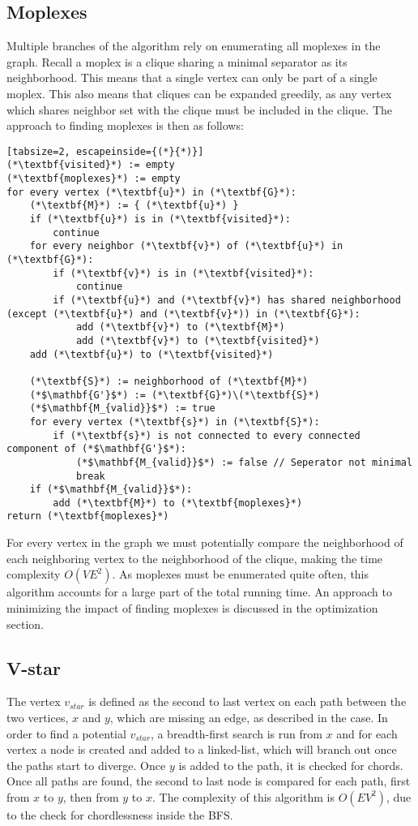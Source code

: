 \documentclass{article}
\begin{document}
		\subsection{Moplexes}
		Multiple branches of the algorithm rely on enumerating all moplexes in the graph.
		Recall a moplex is a clique sharing a minimal separator as its neighborhood.
		This means that a single vertex can only be part of a single moplex.
		This also means that cliques can be expanded greedily, as any vertex which shares neighbor set with the clique must be included in the clique.
		The approach to finding moplexes is then as follows:
		\begin{lstlisting}[tabsize=2, escapeinside={(*}{*)}]
(*\textbf{visited}*) := empty
(*\textbf{moplexes}*) := empty
for every vertex (*\textbf{u}*) in (*\textbf{G}*):
	(*\textbf{M}*) := { (*\textbf{u}*) }
	if (*\textbf{u}*) is in (*\textbf{visited}*):
		continue
	for every neighbor (*\textbf{v}*) of (*\textbf{u}*) in (*\textbf{G}*):
		if (*\textbf{v}*) is in (*\textbf{visited}*):
			continue
		if (*\textbf{u}*) and (*\textbf{v}*) has shared neighborhood (except (*\textbf{u}*) and (*\textbf{v}*)) in (*\textbf{G}*):
			add (*\textbf{v}*) to (*\textbf{M}*)
			add (*\textbf{v}*) to (*\textbf{visited}*)
	add (*\textbf{u}*) to (*\textbf{visited}*)

	(*\textbf{S}*) := neighborhood of (*\textbf{M}*)
	(*$\mathbf{G'}$*) := (*\textbf{G}*)\(*\textbf{S}*)
	(*$\mathbf{M_{valid}}$*) := true
	for every vertex (*\textbf{s}*) in (*\textbf{S}*):
		if (*\textbf{s}*) is not connected to every connected component of (*$\mathbf{G'}$*):
			(*$\mathbf{M_{valid}}$*) := false // Seperator not minimal
			break
	if (*$\mathbf{M_{valid}}$*):
		add (*\textbf{M}*) to (*\textbf{moplexes}*)
return (*\textbf{moplexes}*)
		\end{lstlisting}
		For every vertex in the graph we must potentially compare the neighborhood of each neighboring vertex to the neighborhood of the clique, making the time complexity $O(VE^2)$.
		As moplexes must be enumerated quite often, this algorithm accounts for a large part of the total running time.
		An approach to minimizing the impact of finding moplexes is discussed in the optimization section.

		\subsection{V-star}
		The vertex $v_{star}$ is defined as the second to last vertex on each path between the two vertices, $x$ and $y$, which are missing an edge, as described in the case.
		In order to find a potential $v_{star}$, a breadth-first search is run from $x$ and for each vertex a node is created and added to a linked-list, which will branch out once the paths start to diverge.
		Once $y$ is added to the path, it is checked for chords.
		Once all paths are found, the second to last node is compared for each path, first from $x$ to $y$, then from $y$ to $x$.
		The complexity of this algorithm is $O(EV^2)$, due to the check for chordlessness inside the BFS.
\end{document}
